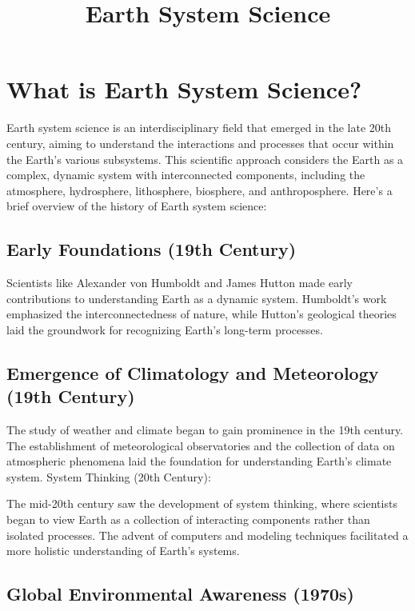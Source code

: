 \documentclass{tufte-handout}\usepackage[]{graphicx}\usepackage[]{xcolor}
\title{Earth System Science}
\begin{document}
\maketitle

\section{What is Earth System Science?}

Earth system science is an interdisciplinary field that emerged in the late 20th century, aiming to understand the interactions and processes that occur within the Earth's various subsystems. This scientific approach considers the Earth as a complex, dynamic system with interconnected components, including the atmosphere, hydrosphere, lithosphere, biosphere, and anthroposphere. Here's a brief overview of the history of Earth system science:

\subsection{Early Foundations (19th Century)}

Scientists like Alexander von Humboldt and James Hutton made early contributions to understanding Earth as a dynamic system. Humboldt's work emphasized the interconnectedness of nature, while Hutton's geological theories laid the groundwork for recognizing Earth's long-term processes.

\subsection{Emergence of Climatology and Meteorology (19th Century)}

The study of weather and climate began to gain prominence in the 19th century. The establishment of meteorological observatories and the collection of data on atmospheric phenomena laid the foundation for understanding Earth's climate system.
System Thinking (20th Century):

The mid-20th century saw the development of system thinking, where scientists began to view Earth as a collection of interacting components rather than isolated processes. The advent of computers and modeling techniques facilitated a more holistic understanding of Earth's systems.

\subsection{Global Environmental Awareness (1970s)}
\end{document}
